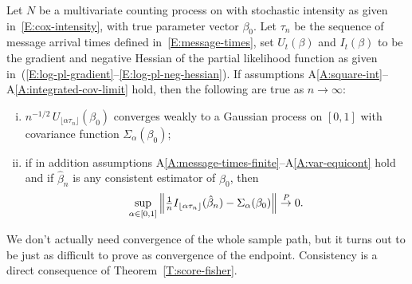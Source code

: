 \documentclass[aoas,preprint]{imsart}
\begin{document}
\begin{theorem}\label{T:score-fisher}
    Let $N$ be a multivariate counting process on with stochastic
    intensity as given in~\eqref{E:cox-intensity}, with true parameter
    vector $\beta_0$.  Let $\tau_n$ be the sequence of message arrival times
    defined in~\eqref{E:message-times}, set $U_t(\beta)$ and $I_t(\beta)$ to
    be the gradient and negative Hessian of the partial likelihood function
    as given in~(\ref{E:log-pl-gradient}--\ref{E:log-pl-neg-hessian}).  If
    assumptions A\ref{A:square-int}--A\ref{A:integrated-cov-limit} hold, then
    the following are true as $n \to \infty$:
    \begin{enumerate}[(i)]
        \item \label{I:score-part}
        $n^{-1/2} \, U_{\lfloor \alpha \tau_n \rfloor}(\beta_0)$
        converges weakly to a Gaussian process on $[0,1]$ with
        covariance function $\Sigma_\alpha(\beta_0)$;
        
        \item \label{I:fisher-part}
        if in addition assumptions
        A\ref{A:message-times-finite}--A\ref{A:var-equicont} hold and
        if $\hat \beta_n$ is any consistent estimator of $\beta_0$,
        then
        \[
            \sup_{\alpha \in [0,1]}
            \left\|
                \tfrac{1}{n}
                I_{\lfloor \alpha \tau_n \rfloor}(\hat \beta_{n})
                -
                \Sigma_\alpha(\beta_0)
            \right\|
            \overset{\mathit{P}}{\to}
            0.
        \]
    \end{enumerate}
\end{theorem}

We don't actually need convergence of the whole sample path, but
it turns out to be just as difficult to prove as convergence of the
endpoint.  Consistency is a direct consequence of
Theorem~\ref{T:score-fisher}.
\end{document}

